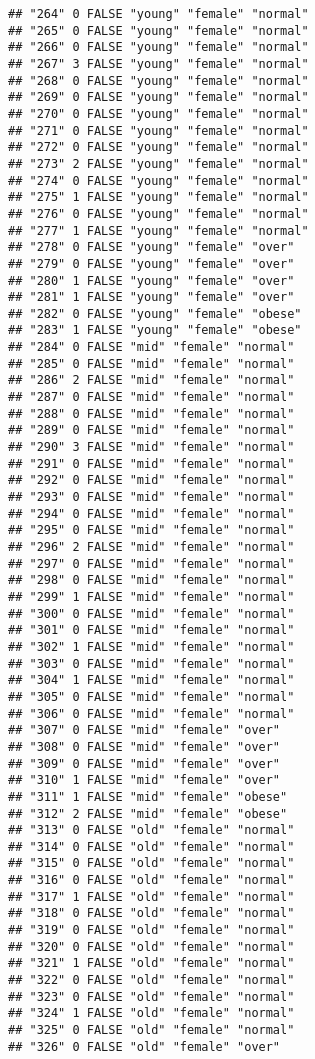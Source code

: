 \documentclass[]{article}
\begin{document}
\begin{verbatim}
## "264" 0 FALSE "young" "female" "normal"
## "265" 0 FALSE "young" "female" "normal"
## "266" 0 FALSE "young" "female" "normal"
## "267" 3 FALSE "young" "female" "normal"
## "268" 0 FALSE "young" "female" "normal"
## "269" 0 FALSE "young" "female" "normal"
## "270" 0 FALSE "young" "female" "normal"
## "271" 0 FALSE "young" "female" "normal"
## "272" 0 FALSE "young" "female" "normal"
## "273" 2 FALSE "young" "female" "normal"
## "274" 0 FALSE "young" "female" "normal"
## "275" 1 FALSE "young" "female" "normal"
## "276" 0 FALSE "young" "female" "normal"
## "277" 1 FALSE "young" "female" "normal"
## "278" 0 FALSE "young" "female" "over"
## "279" 0 FALSE "young" "female" "over"
## "280" 1 FALSE "young" "female" "over"
## "281" 1 FALSE "young" "female" "over"
## "282" 0 FALSE "young" "female" "obese"
## "283" 1 FALSE "young" "female" "obese"
## "284" 0 FALSE "mid" "female" "normal"
## "285" 0 FALSE "mid" "female" "normal"
## "286" 2 FALSE "mid" "female" "normal"
## "287" 0 FALSE "mid" "female" "normal"
## "288" 0 FALSE "mid" "female" "normal"
## "289" 0 FALSE "mid" "female" "normal"
## "290" 3 FALSE "mid" "female" "normal"
## "291" 0 FALSE "mid" "female" "normal"
## "292" 0 FALSE "mid" "female" "normal"
## "293" 0 FALSE "mid" "female" "normal"
## "294" 0 FALSE "mid" "female" "normal"
## "295" 0 FALSE "mid" "female" "normal"
## "296" 2 FALSE "mid" "female" "normal"
## "297" 0 FALSE "mid" "female" "normal"
## "298" 0 FALSE "mid" "female" "normal"
## "299" 1 FALSE "mid" "female" "normal"
## "300" 0 FALSE "mid" "female" "normal"
## "301" 0 FALSE "mid" "female" "normal"
## "302" 1 FALSE "mid" "female" "normal"
## "303" 0 FALSE "mid" "female" "normal"
## "304" 1 FALSE "mid" "female" "normal"
## "305" 0 FALSE "mid" "female" "normal"
## "306" 0 FALSE "mid" "female" "normal"
## "307" 0 FALSE "mid" "female" "over"
## "308" 0 FALSE "mid" "female" "over"
## "309" 0 FALSE "mid" "female" "over"
## "310" 1 FALSE "mid" "female" "over"
## "311" 1 FALSE "mid" "female" "obese"
## "312" 2 FALSE "mid" "female" "obese"
## "313" 0 FALSE "old" "female" "normal"
## "314" 0 FALSE "old" "female" "normal"
## "315" 0 FALSE "old" "female" "normal"
## "316" 0 FALSE "old" "female" "normal"
## "317" 1 FALSE "old" "female" "normal"
## "318" 0 FALSE "old" "female" "normal"
## "319" 0 FALSE "old" "female" "normal"
## "320" 0 FALSE "old" "female" "normal"
## "321" 1 FALSE "old" "female" "normal"
## "322" 0 FALSE "old" "female" "normal"
## "323" 0 FALSE "old" "female" "normal"
## "324" 1 FALSE "old" "female" "normal"
## "325" 0 FALSE "old" "female" "normal"
## "326" 0 FALSE "old" "female" "over"

\end{verbatim}
\end{document}
